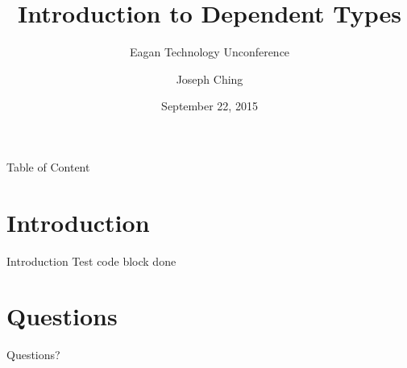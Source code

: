 \documentclass{beamer}
\title{Introduction to Dependent Types}
\subtitle{Eagan Technology Unconference}
\author{Joseph Ching}
\institute{Thomson Reuters}
\date{September 22, 2015}
\newenvironment{code}{\footnotesize\verbatim}{\endverbatim\normalsize}
\begin{document}
\begin{frame}[plain]
    \titlepage
    \end{frame}


\begin{frame}{Table of Content}
    \tableofcontents[pausesections]
    \end{frame}


\section{Introduction}

  \begin{frame}{Introduction}
    Test code block
    done
  \end{frame}

  \begin{frame}
  \end{frame}


\section{Questions}

  \begin{frame}
      Questions?
  \end{frame}
\end{document}
